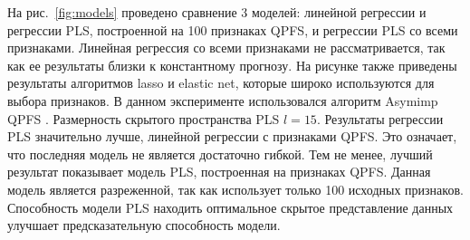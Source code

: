 \documentclass[preprint,12pt]{elsarticle}
\theoremstyle{definition}
\begin{document}
На рис.~\ref{fig:models} проведено сравнение 3 моделей: линейной регрессии и регрессии PLS, построенной на 100 признаках QPFS, и регрессии PLS со всеми признаками.
Линейная регрессия со всеми признаками не рассматривается, так как ее результаты близки к константному прогнозу. На рисунке также приведены результаты алгоритмов lasso и elastic net, которые широко используются для выбора признаков.
В данном эксперименте использовался алгоритм Asymimp QPFS .
Размерность скрытого пространства PLS $l = 15$.
Результаты регрессии PLS значительно лучше, линейной регрессии с признаками QPFS.
Это означает, что последняя модель не является достаточно гибкой.
Тем не менее, лучший результат показывает модель PLS, построенная на признаках QPFS. 
Данная модель является разреженной, так как использует только 100 исходных признаков.
Способность модели PLS находить оптимальное скрытое представление данных улучшает предсказательную способность модели.
\end{document}
